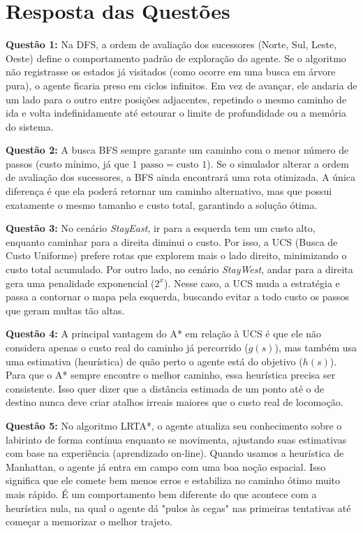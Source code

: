 \documentclass[a4paper,11pt]{article}
\begin{document}
\section{Resposta das Questões}

\textbf{Questão 1:} Na DFS, a ordem de avaliação dos sucessores (Norte, Sul, Leste, Oeste) define o comportamento padrão de exploração do agente. Se o algoritmo não registrasse os estados já visitados (como ocorre em uma busca em árvore pura), o agente ficaria preso em ciclos infinitos. Em vez de avançar, ele andaria de um lado para o outro entre posições adjacentes, repetindo o mesmo caminho de ida e volta indefinidamente até estourar o limite de profundidade ou a memória do sistema.

\textbf{Questão 2:} A busca BFS sempre garante um caminho com o menor número de passos (custo mínimo, já que $1 \text{ passo} = \text{custo } 1$). Se o simulador alterar a ordem de avaliação dos sucessores, a BFS ainda encontrará uma rota otimizada. A única diferença é que ela poderá retornar um caminho alternativo, mas que possui exatamente o mesmo tamanho e custo total, garantindo a solução ótima.

\textbf{Questão 3:} No cenário \textit{StayEast}, ir para a esquerda tem um custo alto, enquanto caminhar para a direita diminui o custo. Por isso, a UCS (Busca de Custo Uniforme) prefere rotas que explorem mais o lado direito, minimizando o custo total acumulado. Por outro lado, no cenário \textit{StayWest}, andar para a direita gera uma penalidade exponencial ($2^x$). Nesse caso, a UCS muda a estratégia e passa a contornar o mapa pela esquerda, buscando evitar a todo custo os passos que geram multas tão altas.

\textbf{Questão 4:} A principal vantagem do A* em relação à UCS é que ele não considera apenas o custo real do caminho já percorrido ($g(s)$), mas também usa uma estimativa (heurística) de quão perto o agente está do objetivo ($h(s)$). Para que o A* sempre encontre o melhor caminho, essa heurística precisa ser consistente. Isso quer dizer que a distância estimada de um ponto até o de destino nunca deve criar atalhos irreais maiores que o custo real de locomoção.

\textbf{Questão 5:} No algoritmo LRTA*, o agente atualiza seu conhecimento sobre o labirinto de forma contínua enquanto se movimenta, ajustando suas estimativas com base na experiência (aprendizado on-line). Quando usamos a heurística de Manhattan, o agente já entra em campo com uma boa noção espacial. Isso significa que ele comete bem menos erros e estabiliza no caminho ótimo muito mais rápido. É um comportamento bem diferente do que acontece com a heurística nula, na qual o agente dá "pulos às cegas" nas primeiras tentativas até começar a memorizar o melhor trajeto.
\end{document}
